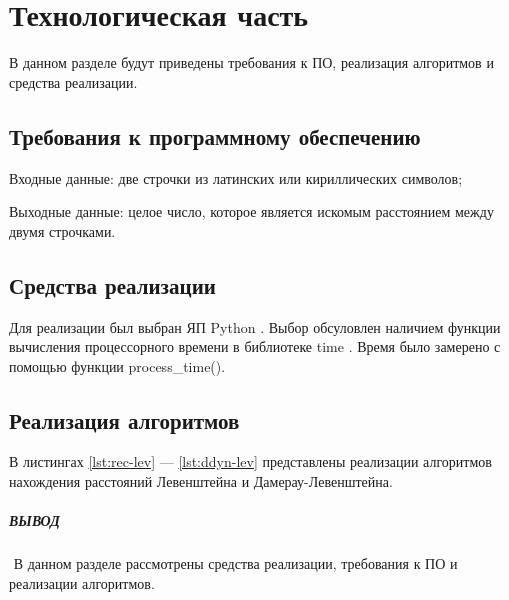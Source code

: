 \chapter{Технологическая часть}

В данном разделе будут приведены требования к ПО, реализация алгоритмов и средства реализации.

\section{Требования к программному обеспечению}

Входные данные: две строчки из латинских или кириллических символов;

Выходные данные: целое число, которое является искомым расстоянием между двумя строчками.


\section{Средства реализации}

Для реализации был выбран ЯП Python \cite{bib1}.
Выбор обсуловлен наличием функции вычисления процессорного времени в библиотеке
time \cite{bib2}. Время было замерено с помощью функции process\_time().

\section{Реализация  алгоритмов}

В листингах \ref{lst:rec-lev} --- \ref{lst:ddyn-lev} представлены реализации алгоритмов
нахождения расстояний Левенштейна и Дамерау-Левенштейна.

\begin{center}
\captionsetup{justification=raggedright,singlelinecheck=off}

\end{center}


\begin{center}
\captionsetup{justification=raggedright,singlelinecheck=off}

\end{center}


\begin{center}
\captionsetup{justification=raggedright,singlelinecheck=off}

\end{center}


\paragraph*{ВЫВОД} ${}$ \newline
В данном разделе рассмотрены средства реализации, требования к ПО и реализации алгоритмов.


\clearpage
